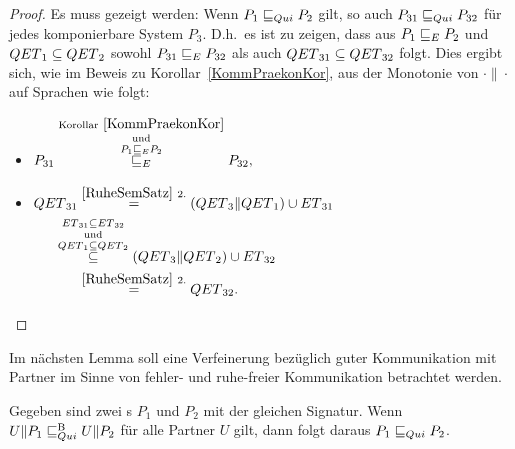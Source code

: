 \begin{proof}
  Es muss gezeigt werden: Wenn $P_1 \sqsubseteq  _{Qui} P_2$ gilt, so auch $P_{31} \sqsubseteq  _{Qui}
  P_{32}$ für jedes komponierbare System $P_3$. D.h.\ es ist zu zeigen, dass
  aus $P_1 \sqsubseteq  _E P_2$ und $QET{}_1\subseteq QET{}_2$ sowohl $P_{31} \sqsubseteq  _E
  P_{32}$ als auch $QET{}_{31}\subseteq QET{}_{32}$ folgt. Dies ergibt sich,
  wie im Beweis zu Korollar~\ref{KommPraekonKor}, aus der Monotonie von
  $\cdot\|\cdot$ auf Sprachen wie folgt:
  \begin{itemize}
    \item $\begin{aligned}[t]
        P_{31} \overset{\mathrm{Korollar}~\ref{KommPraekonKor}}{
          \overset{\mathrm{und}}{\overset{P_1 \sqsubseteq  _E P_2}{ \sqsubseteq  _E}}}
        P_{32},
    \end{aligned}$
    \item $\begin{aligned}[t]
        \QET{}_{31} &\overset{\ref{RuheSemSatz}~2.}{=}
        (\QET{}_3\|\QET{}_1)\cup \ET{}_{31}\\
        &\hspace{-0.6cm}\overset{\ET{}_{31}\subseteq
      \ET{}_{32}}{\overset{\mathrm{und}}{\overset{\QET{}_1\subseteq
      \QET{}_2}{\subseteq}}} (\QET{}_3\|\QET{}_2) \cup \ET{}_{32}\\
        &\overset{\ref{RuheSemSatz}~2.}{=} \QET{}_{32}.
    \end{aligned}$
  \vspace*{-0.7cm}
  \end{itemize}
\end{proof}

Im nächsten Lemma soll eine Verfeinerung bezüglich guter Kommunikation mit
Partner im Sinne von fehler- und ruhe-freier Kommunikation betrachtet werden.

\begin{Lem}
  Gegeben sind zwei \MEIO{}s $P_1$ und $P_2$ mit der gleichen Signatur. Wenn
  $U\|P_1 \sqsubseteq  _{Qui}^\mathrm{B} U\|P_2$ für alle Partner $U$ gilt, dann folgt daraus $P_1 \sqsubseteq  _{Qui}
  P_2$.
\end{Lem}

